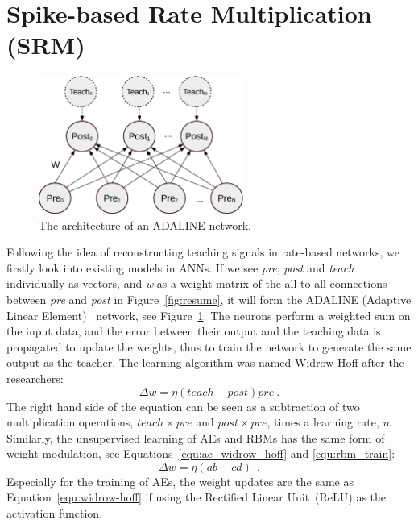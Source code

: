 \section{Spike-based Rate Multiplication (SRM)}
\label{sec:SRM}
\begin{figure}
	\centering
	\includegraphics[width=0.6\textwidth]{pics_sdlm/adaline.png}
	\caption{The architecture of an ADALINE network.}
	\label{fig:adaline}
\end{figure}
Following the idea of reconstructing teaching signals in rate-based networks, we firstly look into existing models in ANNs.
If we see \textit{pre}, \textit{post} and \textit{teach} individually as vectors, and \textit{w} as a weight matrix of the all-to-all connections between \textit{pre} and \textit{post} in Figure~\ref{fig:resume}, it will form the ADALINE (Adaptive Linear Element)~\citep{widrow1960adaptive} network, see Figure~\ref{fig:adaline}.
The \DIFdelbegin {}\DIFdelend \DIFaddbegin \textit{} \DIFaddend neurons perform a weighted sum on the input data, and the error between their output and the teaching data is propagated to update the weights, thus to train the network to generate the same output as the teacher. 
The learning algorithm was named Widrow-Hoff after the researchers:
\begin{equation}
\Delta w = \eta (teach - post)pre~.
\label{equ:widrow-hoff}
\end{equation}
The right hand side of the equation can be seen as a subtraction of two multiplication operations, $teach \times pre$ and $post \times pre$, times a learning rate, $\eta$.
Similarly, the unsupervised learning of AEs and RBMs has the same form of weight modulation, see Equations~\ref{equ:ae_widrow_hoff} and \ref{equ:rbm_train}:
\begin{equation}
\Delta w = \eta (ab-cd)~~.
\label{equ:two_sep}
\end{equation}
Especially for the training of AEs, the weight updates are the same as Equation~\ref{equ:widrow-hoff} if using the Rectified Linear Unit~(ReLU) as the activation function.

